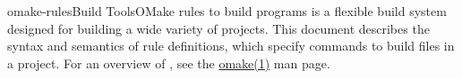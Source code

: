 %
%
%
\begin{Name}{1}{omake-rules}{\authors}{Build Tools}{OMake rules to build programs}
   is a flexible build system designed for building a wide variety of projects.
  This document describes the syntax and semantics of rule definitions, which specify
  commands to build files in a project.
  For an overview of , see the \href{omake.html}{omake(1)} man page.
\end{Name}

